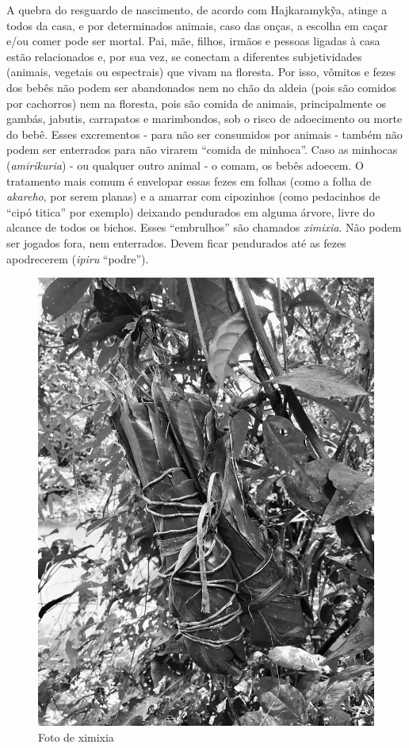 A quebra do resguardo de nascimento, de acordo com Hajkaramykỹa, atinge
a todos da casa, e por determinados animais, caso das onças, a escolha
em caçar e/ou comer pode ser mortal. Pai, mãe, filhos, irmãos e pessoas
ligadas à casa estão relacionados e, por sua vez, se conectam a
diferentes subjetividades (animais, vegetais ou espectrais) que vivam na
floresta. Por isso, vômitos e fezes dos bebês não podem ser abandonados
nem no chão da aldeia (pois são comidos por cachorros) nem na floresta,
pois são comida de animais, principalmente os gambás, jabutis,
carrapatos e marimbondos, sob o risco de adoecimento ou morte do bebê.
Esses excrementos - para não ser consumidos por animais - também não
podem ser enterrados para não virarem ``comida de minhoca''. Caso as
minhocas (\emph{amirikuria}) - ou qualquer outro animal - o comam, os
bebês adoecem. O tratamento mais comum é envelopar essas fezes em folhas
(como a folha de \emph{akareho}, por serem planas) e a amarrar com
cipozinhos (como pedacinhos de ``cipó titica'' por exemplo) deixando
pendurados em alguma árvore, livre do alcance de todos os bichos. Esses
``embrulhos'' são chamados \emph{ximixia}. Não podem ser jogados fora,
nem enterrados. Devem ficar pendurados até as fezes apodrecerem
(\emph{ipiru} ``podre'').

\begin{figure}[H]
\centering
  \includegraphics[width=\textwidth]{./imgs/IMG_4613}
\caption{Foto de ximixia}
\end{figure}

